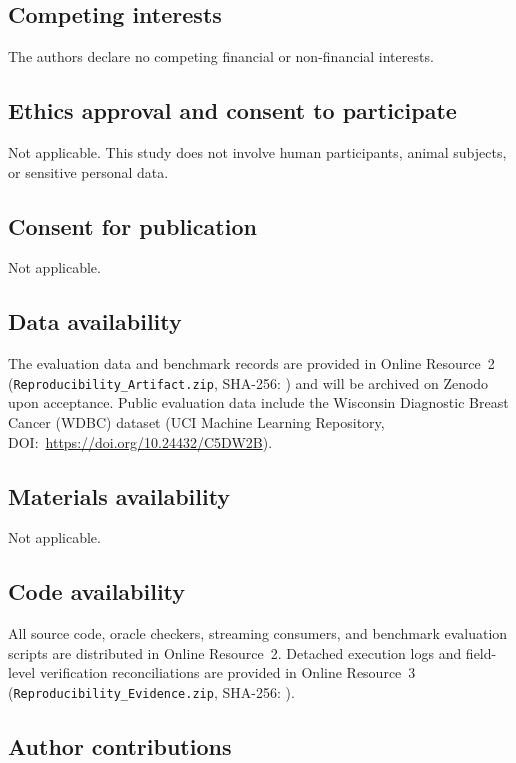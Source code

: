\documentclass[11pt,a4paper]{article}
\begin{document}
\subsection*{Competing interests}
The authors declare no competing financial or non-financial interests.

\subsection*{Ethics approval and consent to participate}
Not applicable. This study does not involve human participants, animal subjects, or sensitive personal data.

\subsection*{Consent for publication}
Not applicable.

\subsection*{Data availability}
The evaluation data and benchmark records are provided in Online Resource~2 (\texttt{Reproduci\allowbreak bility\_\allowbreak Artifact.\allowbreak zip}, SHA-256: \texttt{}) and will be archived on Zenodo upon acceptance. Public evaluation data include the Wisconsin Diagnostic Breast Cancer (WDBC) dataset (UCI Machine Learning Repository, DOI:\allowbreak\ \url{https://doi.org/10.24432/C5DW2B}).

\subsection*{Materials availability}
Not applicable.

\subsection*{Code availability}
All source code, oracle checkers, streaming consumers, and benchmark evaluation scripts are distributed in Online Resource~2. Detached execution logs and field-level verification reconciliations are provided in Online Resource~3 (\texttt{Reproducibility\_\allowbreak Evidence.\allowbreak zip}, SHA-256: \texttt{}).

\subsection*{Author contributions}
\end{document}
